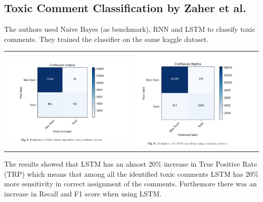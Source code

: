 \documentclass[11pt]{article}
\begin{document}
\subsection{Toxic Comment Classification by Zaher et al.}
The authors used Naive Bayes (as benchmark), RNN and LSTM to classify toxic comments. They trained the classifier on the same kaggle dataset. 
	\begin{tabular}{cc}
		\includegraphics[width=85mm]{figs/zaher_bayes.png} & \includegraphics[width=85mm]{figs/zaher_lstm.png} \\
	\end{tabular}
The results showed that LSTM has an almost 20\% increase in True Positive Rate (TRP) which means that among all the identified toxic comments
LSTM has 20\% more sensitivity in correct assignment of the comments. Furthemore there was an increase in Recall and F1 score when using LSTM.
\end{document}
